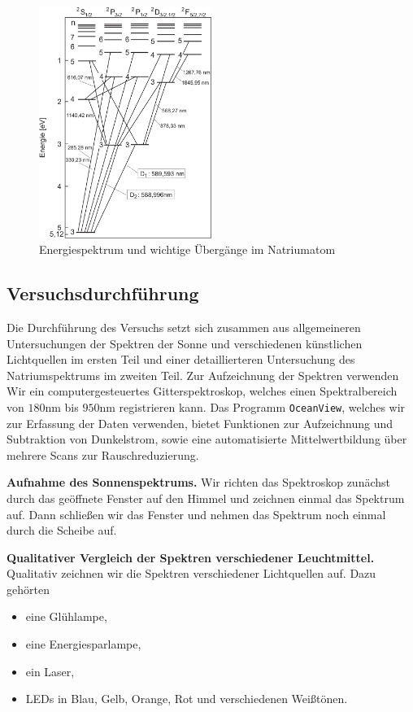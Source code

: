 \begin{figure}[H]
  \centering
  \includegraphics[width=0.5\textwidth]{files/uebergaenge.png}
  \caption{Energiespektrum und wichtige Übergänge im Natriumatom}
  \label{fig:uebergaenge}
\end{figure}

\newpage

\subsection{Versuchsdurchführung}

Die Durchführung des Versuchs setzt sich zusammen aus allgemeineren Untersuchungen der Spektren der Sonne und verschiedenen künstlichen Lichtquellen im ersten Teil und einer detaillierteren Untersuchung des Natriumspektrums im zweiten Teil. Zur Aufzeichnung der Spektren verwenden Wir ein computergesteuertes Gitterspektroskop, welches einen Spektralbereich von $180\si{\nano\meter}$ bis $950\si{\nano\meter}$ registrieren kann. Das Programm \texttt{OceanView}, welches wir zur Erfassung der Daten verwenden, bietet Funktionen zur Aufzeichnung und Subtraktion von Dunkelstrom, sowie eine automatisierte Mittelwertbildung über mehrere Scans zur Rauschreduzierung.

\textbf{Aufnahme des Sonnenspektrums.} Wir richten das Spektroskop zunächst durch das geöffnete Fenster auf den Himmel und zeichnen einmal das Spektrum auf. Dann schließen wir das Fenster und nehmen das Spektrum noch einmal durch die Scheibe auf.

\textbf{Qualitativer Vergleich der Spektren verschiedener Leuchtmittel.} Qualitativ zeichnen wir die Spektren verschiedener Lichtquellen auf. Dazu gehörten
\begin{itemize}
  \item eine Glühlampe,
  \item eine Energiesparlampe,
  \item ein Laser,
  \item LEDs in Blau, Gelb, Orange, Rot und verschiedenen Weißtönen.
\end{itemize}

